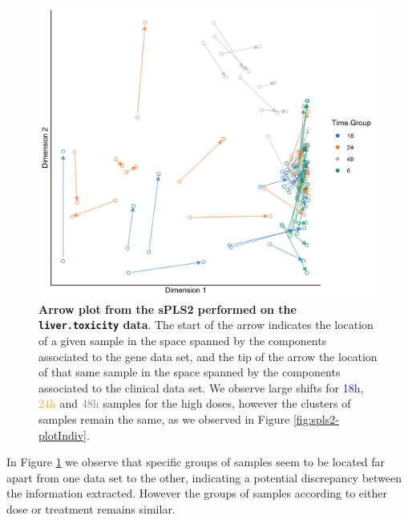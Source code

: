 \documentclass[]{book}
\newenvironment{Shaded}{\begin{snugshade}}{\end{snugshade}}
\newcommand{\DataTypeTok}[1]{\textcolor[rgb]{0.13,0.29,0.53}{#1}}
\newcommand{\DecValTok}[1]{\textcolor[rgb]{0.00,0.00,0.81}{#1}}
\newcommand{\KeywordTok}[1]{\textcolor[rgb]{0.13,0.29,0.53}{\textbf{#1}}}
\newcommand{\NormalTok}[1]{#1}
\newcommand{\OperatorTok}[1]{\textcolor[rgb]{0.81,0.36,0.00}{\textbf{#1}}}
\newcommand{\OtherTok}[1]{\textcolor[rgb]{0.56,0.35,0.01}{#1}}
\newcommand{\StringTok}[1]{\textcolor[rgb]{0.31,0.60,0.02}{#1}}
\begin{document}
\begin{Shaded}
\end{Shaded}

\begin{figure}

{\centering \includegraphics[width=0.5\linewidth]{Figures/PLS/spls2-plotArrow-1} 

}

\caption{\textbf{Arrow plot from the sPLS2 performed on the \texttt{liver.toxicity} data}. The start of the arrow indicates the location of a given sample in the space spanned by the components associated to the gene data set, and the tip of the arrow the location of that same sample in the space spanned by the components associated to the clinical data set. We observe large shifts for \textcolor{blue}{18h}, \textcolor{orange}{24h} and \textcolor{grey}{48h} samples for the high doses, however the clusters of samples remain the same, as we observed in Figure \ref{fig:spls2-plotIndiv}.}\label{fig:spls2-plotArrow}
\end{figure}



In Figure \ref{fig:spls2-plotArrow} we observe that specific groups of samples seem to be located far apart from one data set to the other, indicating a potential discrepancy between the information extracted. However the groups of samples according to either dose or treatment remains similar.
\end{document}
